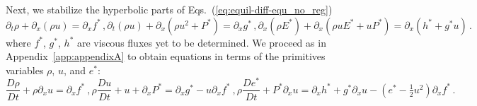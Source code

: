 \documentclass[review]{elsarticle}
\newcommand{\eqts}[1]{Eqs.~(\ref{#1})}                     %
\newcommand{\app}[1]{Appendix~\ref{#1}}                     %
\newcommand{\matder}[1]{\frac{D #1}{Dt}}
\begin{document}
\begin{appendices}
Next, we stabilize the hyperbolic parts of \eqts{eq:equil-diff-equ_no_reg}
%
\begin{subequations}
\label{eq:equil-diff-equ_with_reg}
%
\begin{equation}
\partial_t \rho + \partial_x \left( \rho u \right) = \partial_x f^* \, ,
\end{equation}
%
\begin{equation}
\partial_t \left( \rho u \right) + \partial_x \left( \rho u^2 + P^* \right) = \partial_x g^* \, , 
\end{equation}
%
\begin{equation}
\partial_x \left( \rho E^* \right) + \partial_x \left( \rho u E^* + u P^* \right) =  \partial_x \left( h^* + g^* u \right) \, . 
\end{equation}
%
\end{subequations}
%
where $f^*$, $g^*$, $h^*$ are viscous fluxes yet to be determined. We proceed as in \app{app:appendixA} to obtain equations in terms 
of the primitives variables $\rho$, $u$, and $e^*$:
%
\begin{subequations}
\label{eq:equil-diff-equ_with_reg_prim}
%
\begin{equation} \label{eq:equil-diff-equ_with_reg_prim_rho}
\matder \rho + \rho \partial_x  u  = \partial_x f^* \ ,
\end{equation}
%
\begin{equation}
\rho \matder u + u  + \partial_x  P^*  = \partial_x g^* - u \partial_x f^* \ , 
\end{equation}
%
\begin{equation} \label{eq:equil-diff-equ_with_reg_prim_e}
\rho \matder {e^*}  +  P^* \partial_x u  =  \partial_x h^* + g^* \partial_x u - \left( e^* - \tfrac 1 2 u^2 \right) \partial_x  f^*\, . 
\end{equation}
%
\end{subequations}


\end{appendices}
\end{document}
